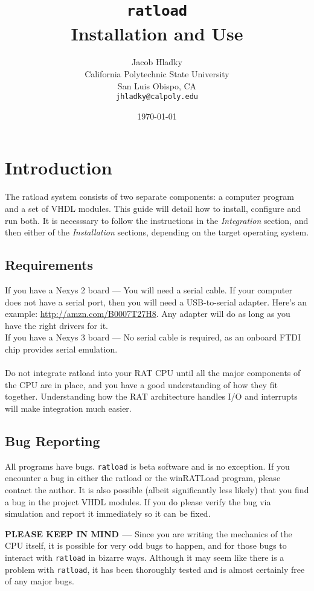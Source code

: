 \documentclass[notitlepage]{article}
\makeatletter
\newcommand*{\toccontents}{\@starttoc{toc}}
\makeatother
\begin{document}
\title{\huge{\texttt{ratload}\\ Installation and Use}}
\author{
  Jacob Hladky\\
  California Polytechnic State University\\
  San Luis Obispo, CA\\
  \texttt{jhladky@calpoly.edu}
}
\date{\today}
\maketitle

\toccontents


\section{Introduction}
The ratload system consists of two separate components: a computer program and a set of VHDL modules. This guide will detail how to install, configure and run both. It is necesssary to follow the instructions in the \emph{Integration} section, and then either of the \emph{Installation} sections, depending on the target operating system.
\subsection{Requirements}
If you have a Nexys 2 board --- You will need a serial cable. If your computer does not have a serial port, then you will need a USB-to-serial adapter. Here's an example: \url{http://amzn.com/B0007T27H8}. Any adapter will do as long as you have the right drivers for it.\\
If you have a Nexys 3 board --- No serial cable is required, as an onboard FTDI chip provides serial emulation.\\\\
Do not integrate ratload into your RAT CPU until all the major components of the CPU are in place, and you have a good understanding of how they fit together. Understanding how the RAT architecture handles I/O and interrupts will make integration much easier.
\subsection{Bug Reporting}
All programs have bugs. \texttt{ratload} is beta software and is no exception. If you encounter a bug in either the ratload or the winRATLoad program, please contact the author. It is also possible (albeit significantly less likely) that you find a bug in the project VHDL modules. If you do please verify the bug via simulation and report it immediately so it can be fixed.
\begin{infobox}
\textbf{PLEASE KEEP IN MIND --- } Since you are writing the mechanics of the CPU itself, it is possible for very odd bugs to happen, and for those bugs to interact with \texttt{ratload} in bizarre ways. Although it may seem like there is a problem with \texttt{ratload}, it has been thoroughly tested and is almost certainly free of any major bugs.
\end{infobox}
\end{document}

